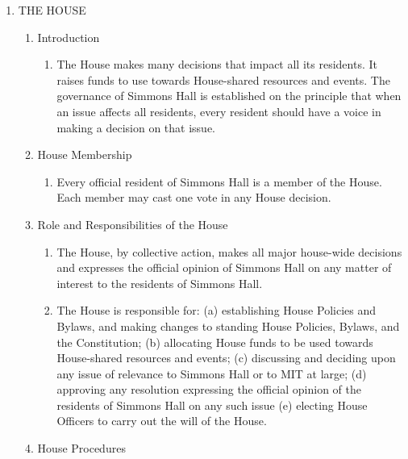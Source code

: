 \documentclass[letterpaper]{article}
\newcounter{saveenum}
\newcommand\liststyleWWNumv{%
\renewcommand\theenumi{\Roman{enumi}}
\renewcommand\theenumii{\arabic{enumii}}
\renewcommand\theenumiii{\arabic{enumiii}}
\renewcommand\theenumiv{\arabic{enumiv}}
\renewcommand\labelenumi{\theenumi.}
\renewcommand\labelenumii{\theenumii.}
\renewcommand\labelenumiii{\theenumiii)}
\renewcommand\labelenumiv{\theenumiv.}
}
\begin{document}
\liststyleWWNumv
\setcounter{saveenum}{\value{enumi}}
\begin{enumerate}
\setcounter{enumi}{\value{saveenum}}
\item THE HOUSE 

\begin{enumerate}
\item Introduction 

\begin{enumerate}
\item The House makes many decisions that impact all its residents. It
raises funds to use towards House-shared resources and events. The
governance of Simmons Hall is established on the principle that when an
issue affects all residents, every resident should have a voice in
making a decision on that issue. 
\end{enumerate}
\item House Membership 

\begin{enumerate}
\item Every official resident of Simmons Hall is a member of the House.
Each member may cast one vote in any House decision.
\end{enumerate}
\item Role and Responsibilities of the House 

\begin{enumerate}
\item The House, by collective action, makes all major house-wide
decisions and expresses the official opinion of Simmons Hall on any
matter of interest to the residents of Simmons Hall.
\item The House is responsible for: (a) establishing House Policies and
Bylaws, and making changes to standing House Policies, Bylaws, and the
Constitution; (b) allocating House funds to be used towards
House-shared resources and events; (c) discussing and deciding upon any
issue of relevance to Simmons Hall or to MIT at large; (d) approving
any resolution expressing the official opinion of the residents of
Simmons Hall on any such issue (e) electing House Officers to carry out
the will of the House.
\end{enumerate}
\item House Procedures 


\end{enumerate}
\end{enumerate}
\end{document}
